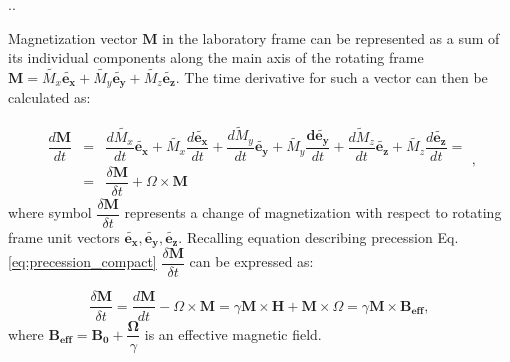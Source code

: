 \documentclass[handout]{beamer}
\begin{document}
\begin{frame}[shrink=5]{\thesection.\thesubsection. \insertsubsection}

 Magnetization vector $\bm{M}$ in the laboratory frame can be represented as a sum of its individual components along the main axis of the rotating frame $\bm{M} = \tilde{M_x} \bm{\tilde{e_x}} + \tilde{M_y} \bm{\tilde{e_y}}+ \tilde{M_z} \bm{\tilde{e_z}}$.  The time derivative for such a vector can then be calculated as:
 
 \begin{equation}
 \begin{array} {lcl}
 \dfrac{d\bm{M}}{dt} &=& \dfrac{d\tilde{M_x}}{dt} \bm{\tilde{e_x}} + \tilde{M_x} \dfrac{d\bm{\tilde{e_x}}}{dt} + \dfrac{\tilde{dM_y}}{dt} \bm{\tilde{e_y}} + \tilde{M_y} \dfrac{\bm{d\tilde{e_y}}}{dt} + \dfrac{\tilde{dM_z}}{dt} \bm{\tilde{e_z}} + \tilde{M_z} \dfrac{d\bm{\tilde{e_z}}}{dt} = \\
 &=& \dfrac{\delta \bm{M}}{\delta t} + \Omega \times \bm{M}
 \end{array},
 \end{equation}
 where symbol $\dfrac{\delta \bm{M}}{\delta t}$ represents a change of magnetization with respect to rotating frame unit vectors $\bm{\tilde{e_x}}, \bm{\tilde{e_y}}, \bm{\tilde{e_z}}$. Recalling equation describing precession  Eq.\ref{eq:precession_compact}  $\dfrac{\delta \bm{M}}{\delta t}$ can be expressed as:

 \begin{equation}
 \dfrac{\delta \bm{M}}{\delta t} = \dfrac{d\bm{M}}{dt} - \Omega \times \bm{M} = \gamma \bm{M} \times \bm{H} + \bm{M} \times \Omega = \gamma \bm{M} \times \bm{B_{eff}},
 \end{equation}
 where  $\bm {B_{eff}} = \bm{B_0} + \dfrac{\bm {\Omega}}{\gamma}$ is an effective magnetic field. 


\end{frame}
\end{document}
